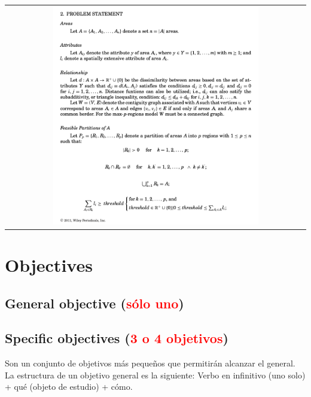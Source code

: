 \documentclass[12pt,letterpaper]{article}
\begin{document}
 \begin{center}
  \begin{tabular}{c}
    \includegraphics[width=0.70\textwidth]{problem_statement}
  \end{tabular}
\end{center}


\section{Objectives}

\subsection{General objective (\textcolor{red}{sólo uno})}

\subsection{Specific objectives (\textcolor{red}{3 o 4 objetivos})}

Son un conjunto de objetivos más pequeños que permitirán alcanzar el general.
La estructura de un objetivo general es la siguiente: Verbo en infinitivo (uno
solo) + qué (objeto de estudio) + cómo.
\end{document}

